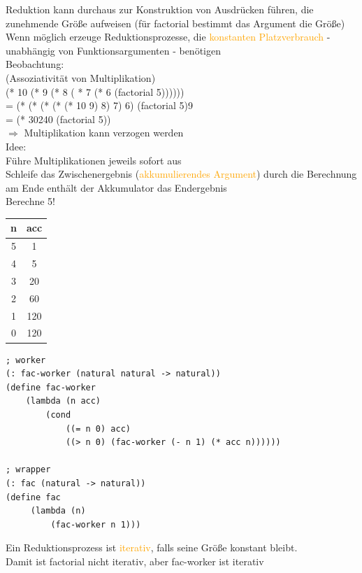 \documentclass[paper=a4, fontsize=11pt]{scrartcl}
\numberwithin{equation}{section}
\numberwithin{figure}{section}
\numberwithin{table}{section}
\begin{document}
\begin{lstlistig}
Reduktion kann durchaus zur Konstruktion von Ausdrücken führen, die zunehmende Größe aufweisen (für factorial bestimmt das Argument die Größe) \\

Wenn möglich erzeuge Reduktionsprozesse, die \textcolor{orange}{konstanten Platzverbrauch} - unabhängig von Funktionsargumenten - benötigen \\

Beobachtung: \\
(Assoziativität von Multiplikation) \\
(* 10 (* 9 (* 8 ( * 7 (* 6 (factorial 5)))))) \\
= (* (* (* (* (* 10 9) 8) 7) 6) (factorial 5)9 \\
= (* 30240 (factorial 5)) \\
$\Rightarrow$ Multiplikation kann verzogen werden \\

Idee: \\
Führe Multiplikationen jeweils sofort aus \\
Schleife das Zwischenergebnis (\textcolor{orange}{akkumulierendes Argument}) durch die Berechnung \\
am Ende enthält der Akkumulator das Endergebnis \\

Berechne 5! \\
\begin{tabular}{c|c}
n & acc \\\hline
5 & 1 \\
4 & 5 \\
3 & 20 \\
2 & 60 \\
1 & 120 \\
0 & 120 \\
\end{tabular} 

\begin{lstlisting}
; worker
(: fac-worker (natural natural -> natural))
(define fac-worker
    (lambda (n acc)
        (cond
            ((= n 0) acc)
            ((> n 0) (fac-worker (- n 1) (* acc n))))))
            
; wrapper
(: fac (natural -> natural))
(define fac
     (lambda (n)
         (fac-worker n 1)))            
\end{lstlisting}

Ein Reduktionsprozess ist \textcolor{orange}{iterativ}, falls seine Größe konstant bleibt. \\
Damit ist factorial nicht iterativ, aber fac-worker ist iterativ \\


\end{lstlistig}
\end{document}
